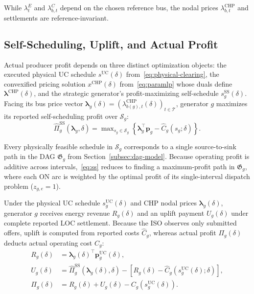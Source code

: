 \documentclass[journal]{IEEEtran}
\newcommand{\bp}{\bm p}
\newcommand{\blambda}{\bm\lambda}
\newcommand{\UC}{\mathrm{UC}}
\newcommand{\SSched}{\mathrm{SS}}
\newcommand{\CHP}{\mathrm{CHP}}
\begin{document}
While $\lambda_t^E$ and $\lambda_{b,t}^C$ depend on the chosen reference bus, the nodal prices $\lambda_{b,t}^{\CHP}$ and settlements are reference-invariant.

\subsection{Self-Scheduling, Uplift, and Actual Profit}
Actual producer profit depends on three distinct optimization objects: the executed physical UC schedule $s^{\UC}(\delta)$ from~\eqref{eq:physical-clearing}, the convexified pricing solution $x^{\CHP}(\delta)$ from~\eqref{eq:paramlp} whose duals define $\blambda^{\CHP}(\delta)$, and the strategic generator's profit-maximizing self-schedule $s_g^{\SSched}(\delta)$. Facing its bus price vector $\blambda_g(\delta)=(\lambda_{b(g),t}^{\CHP}(\delta))_{t\in\mathcal{T}}$, generator $g$ maximizes its reported self-scheduling profit over $\mathcal{S}_g$:
\begin{equation}
\widehat{\Pi}_g^{\SSched}(\blambda_g,\delta)
= \max\nolimits_{s_g\in\mathcal{S}_g}
\left\{ \blambda_g^\top\bp_g - \widehat{C}_g(s_g;\delta) \right\}.\label{eq:ss}
\end{equation}

Every physically feasible schedule in $\mathcal{S}_g$ corresponds to a single source-to-sink path in the DAG $\mathfrak{G}_g$ from Section~\ref{subsec:dag-model}. Because operating profit is additive across intervals,~\eqref{eq:ss} reduces to finding a maximum-profit path in $\mathfrak{G}_g$, where each ON arc is weighted by the optimal profit of its single-interval dispatch problem ($z_{g,e}=1$).

Under the physical UC schedule $s_g^{\UC}(\delta)$ and CHP nodal prices $\blambda_g(\delta)$, generator $g$ receives energy revenue $R_g(\delta)$ and an uplift payment $U_g(\delta)$ under complete reported LOC settlement. Because the ISO observes only submitted offers, uplift is computed from reported costs $\widehat{C}_g$, whereas actual profit $\Pi_g(\delta)$ deducts actual operating cost $C_g$:
\begin{align}
R_g(\delta) &= \blambda_g(\delta)^\top\bp_g^{\UC}(\delta),\label{eq:revenue}\\
U_g(\delta) &= \widehat{\Pi}_g^{\SSched}(\blambda_g(\delta),\delta)
- \left[ R_g(\delta) - \widehat{C}_g(s_g^{\UC}(\delta);\delta) \right],\label{eq:uplift}\\
\Pi_g(\delta) &= R_g(\delta) + U_g(\delta) - C_g(s_g^{\UC}(\delta)).\label{eq:profit}
\end{align}
\end{document}
